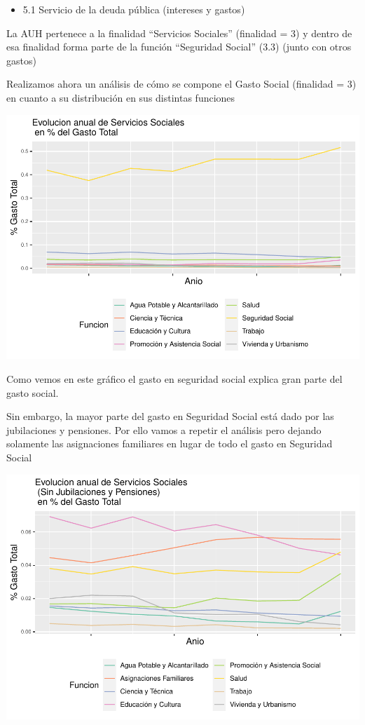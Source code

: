\documentclass[
  12,
]{article}
\providecommand{\tightlist}{%
  \setlength{\itemsep}{0pt}\setlength{\parskip}{0pt}}
\begin{document}
\begin{itemize}
  \begin{itemize}
  \tightlist
  \item
    5.1 Servicio de la deuda pública (intereses y gastos)
  \end{itemize}
\end{itemize}

La AUH pertenece a la finalidad ``Servicios Sociales'' (finalidad = 3) y
dentro de esa finalidad forma parte de la función ``Seguridad Social''
(3.3) (junto con otros gastos)

Realizamos ahora un análisis de cómo se compone el Gasto Social
(finalidad = 3) en cuanto a su distribución en sus distintas funciones

\includegraphics{Grupo4_Final_files/figure-latex/graficos_presu_3-1.pdf}

Como vemos en este gráfico el gasto en seguridad social explica gran
parte del gasto social.

Sin embargo, la mayor parte del gasto en Seguridad Social está dado por
las jubilaciones y pensiones. Por ello vamos a repetir el análisis pero
dejando solamente las asignaciones familiares en lugar de todo el gasto
en Seguridad Social

\includegraphics{Grupo4_Final_files/figure-latex/graficos_presu_4-1.pdf}
\end{document}

